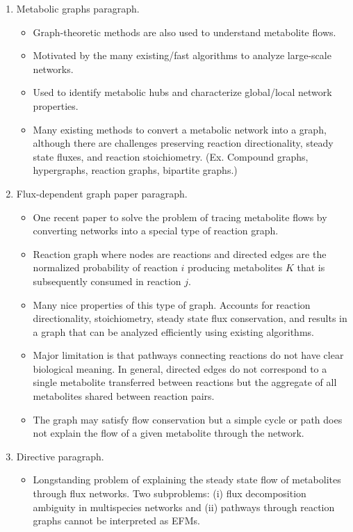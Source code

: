 \documentclass[11pt]{article}
\begin{document}
\begin{enumerate}
\begin{itemize}
    \end{itemize}
    \item Metabolic graphs paragraph.
    \begin{itemize}
        \item Graph-theoretic methods are also used to understand metabolite flows.
        \item Motivated by the many existing/fast algorithms to analyze large-scale networks.
        \item Used to identify metabolic hubs and characterize global/local network properties.
        \item Many existing methods to convert a metabolic network into a graph, although there are challenges preserving reaction directionality, steady state fluxes, and reaction stoichiometry. (Ex. Compound graphs, hypergraphs, reaction graphs, bipartite graphs.)
    \end{itemize}
    \item Flux-dependent graph paper paragraph.
    \begin{itemize}
        \item One recent paper to solve the problem of tracing metabolite flows by converting networks into a special type of reaction graph.
        \item Reaction graph where nodes are reactions and directed edges are the normalized probability of reaction $i$ producing metabolites $K$ that is subsequently consumed in reaction $j$.
        \item Many nice properties of this type of graph. Accounts for reaction directionality, stoichiometry, steady state flux conservation, and results in a graph that can be analyzed efficiently using existing algorithms.
        \item Major limitation is that pathways connecting reactions do not have clear biological meaning. In general, directed edges do not correspond to a single metabolite transferred between reactions but the aggregate of all metabolites shared between reaction pairs.
        \item The graph may satisfy flow conservation but a simple cycle or path does not explain the flow of a given metabolite through the network.
    \end{itemize}
    \item Directive paragraph.
    \begin{itemize}
        \item Longstanding problem of explaining the steady state flow of metabolites through flux networks. Two subproblems: (i) flux decomposition ambiguity in multispecies networks and (ii) pathways through reaction graphs cannot be interpreted as EFMs.

\end{itemize}
\end{enumerate}
\end{document}
